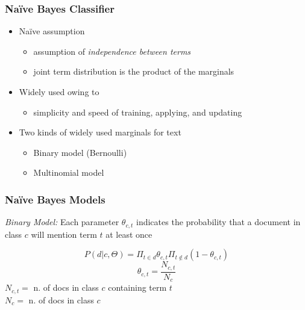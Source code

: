 \documentclass{beamer}
\begin{document}
\begin{frame} \frametitle{Na{\"i}ve Bayes Classifier}
  
  \begin{itemize}
  \item Na{\"i}ve assumption
    \begin{itemize}
    \item assumption of \emph{independence between terms}
    \item joint term distribution is the product of the marginals
    \end{itemize}
  \item Widely used owing to
    \begin{itemize}
    \item simplicity and speed of training, applying, and updating
    \end{itemize}
  \item Two kinds of widely used marginals for text
    \begin{itemize}
    \item Binary model (Bernoulli)
    \item Multinomial model
    \end{itemize}
  \end{itemize}

\end{frame}


\begin{frame} \frametitle{Na{\"i}ve Bayes Models}

    \emph{Binary Model:}  %
    Each parameter $\theta_{c,t}$ indicates the probability that a document in class $c$ will mention term $t$ at least once

    \begin{displaymath}
        P(d|c,\Theta) = \Pi_{t \in d}\theta_{c,t} \Pi_{t \not\in d}(1-\theta_{c,t})
    \end{displaymath}
    \begin{displaymath}
        \theta_{c,t} = \frac{N_{c,t}}{N_c}
    \end{displaymath}
    $N_{c,t} =$ n. of docs in class $c$ containing term $t$\\
    $N_c = $ n. of docs in class $c$
\end{frame}
\end{document}
